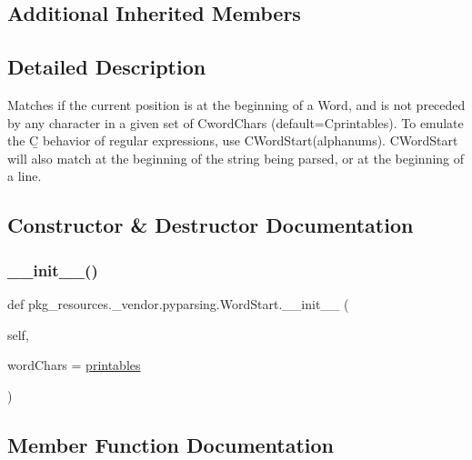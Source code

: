 \subsection*{Additional Inherited Members}


\subsection{Detailed Description}
\begin{DoxyVerb}Matches if the current position is at the beginning of a Word, and
is not preceded by any character in a given set of C{wordChars}
(default=C{printables}). To emulate the C{\b} behavior of regular expressions,
use C{WordStart(alphanums)}. C{WordStart} will also match at the beginning of
the string being parsed, or at the beginning of a line.
\end{DoxyVerb}
 

\subsection{Constructor \& Destructor Documentation}
\mbox{\label{classpkg__resources_1_1__vendor_1_1pyparsing_1_1WordStart_a831062c51876abb4ae5547bc3106a1cd}} 
\subsubsection{\texorpdfstring{\+\_\+\+\_\+init\+\_\+\+\_\+()}{\_\_init\_\_()}}
{\footnotesize\ttfamily def pkg\+\_\+resources.\+\_\+vendor.\+pyparsing.\+Word\+Start.\+\_\+\+\_\+init\+\_\+\+\_\+ (\begin{DoxyParamCaption}\item[{}]{self,  }\item[{}]{word\+Chars = {\ttfamily \hyperlink{namespacepkg__resources_1_1__vendor_1_1pyparsing_af6012db114d431b92334582e9f73eae2}{printables}} }\end{DoxyParamCaption})}



\subsection{Member Function Documentation}
\mbox{\label{classpkg__resources_1_1__vendor_1_1pyparsing_1_1WordStart_a3527eebc17d62454214d6bf543db986b}} 
